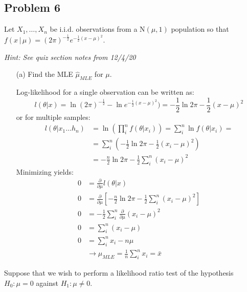 \documentclass{article}
\newcommand{\1}{\mathbf{1}}
\begin{document}
\newpage
\subsection*{Problem 6}
Let $X_1, \ldots ,X_n$ be i.i.d. observations from a N$(\mu,1)$ population so that $f(x \,|\, \mu ) = (2\pi)^{-\frac{1}{2}}e^{-\frac{1}{2}(x-\mu)^2}$.\par
 {\it Hint: See quiz section notes from 12/4/20}
 
 \begin{itemize}
    \item[(a)] Find the MLE $\hat{\mu}_{MLE}$ for $\mu$.
    
    Log-likelihood for a single observation can be written as:
    $$l(\theta|x) = \ln{(2\pi)^{-\frac{1}{2}}} - \ln{e^{-\frac{1}{2}(x-\mu)^2})} = -\frac{1}{2}\ln{2\pi} - \frac{1}{2}(x-\mu)^2 $$
    or for multiple samples:
    \begin{align*}
        l(\theta|x_1\hdots h_n) &= \ln{\left(\prod_i^n f(\theta | x_i)\right)} = \sum_i^n \ln{f(\theta|x_i)} = \\
        &= \sum_i^n\left( -\frac{1}{2}\ln{2\pi} - \frac{1}{2}(x_i -\mu)^2 \right) \\
        &=  -\frac{n}{2}\ln{2\pi} - \frac{1}{2} \sum_i^n (x_i -\mu)^2
    \end{align*}
    Minimizing yields:
    \begin{align*}
        0 &= \frac{\partial}{\partial\mu} l(\theta|x) \\
        0 &= \frac{\partial}{\partial\mu} \left[  -\frac{n}{2}\ln{2\pi} - \frac{1}{2} \sum_i^n (x_i -\mu)^2 \right] \\
        0 &= - \frac{1}{2}  \sum_i^n \frac{\partial}{\partial\mu}  (x_i -\mu)^2 \\
        0 &= \sum_i^n (x_i -\mu) \\
        0 &= \sum_i^n x_i - n\mu \\
        &\rightarrow \mu_{MLE} = \frac{1}{n} \sum_i^n x_i = \bar x
    \end{align*}
\end{itemize}
\newpage
\noindent Suppose that we wish to perform a likelihood ratio test of the hypothesis $H_0:\mu = 0$ against  $H_1: \mu \neq 0$.
\end{document}
